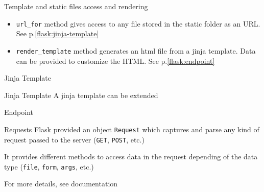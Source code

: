 \begin{frame}{Template and static files access and rendering}
    \begin{itemize}
        \item \texttt{url\_for} method gives access to any file stored in the static folder as an URL. See p.\ref{flask:jinja-template}
        \item \texttt{render\_template} method generates an html file from a jinja template. Data can be provided to customize the HTML. See p.\ref{flask:endpoint}
    \end{itemize}
    

\end{frame}

\begin{frame}{Jinja Template}\label{flask:jinja-template}

    
\end{frame}

\begin{frame}{Jinja Template}
    A jinja template can be extended 
\end{frame}


\begin{frame}{Endpoint}\label{flask:endpoint}


\end{frame}

\begin{frame}{Requests}
    Flask provided an object \texttt{Request} which captures and parse any kind of request passed to the server (\texttt{GET}, \texttt{POST}, etc.)


    It provides different methods to access data in the request depending of the data type (\texttt{file}, \texttt{form}, \texttt{args}, etc.)

    For more details, see  documentation 
    

\end{frame}
